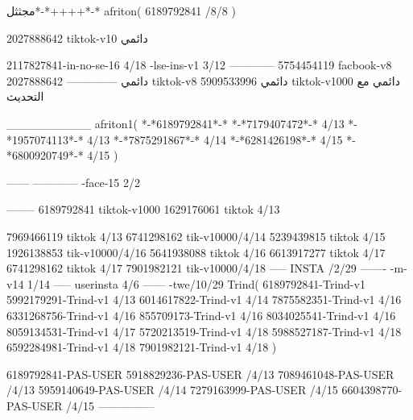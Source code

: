 مجثثل*-*++++*-*
afriton(
6189792841 /8/8
)

2027888642 tiktok-v10
دائمي

2117827841-in-no-se-16 4/18
-lse-ins-v1 3/12
------------
5754454119 facbook-v8
دائمي
--------------
2027888642 tiktok-v8
دائمي
5909533996 tiktok-v1000
دائمي مع التحديث

__________
afriton1(
*-*6189792841*-*
*-*7179407472*-* 4/13
*-*1957074113*-* 4/13
*-*7875291867*-* 4/14
*-*6281426198*-* 4/15
*-*6800920749*-* 4/15
)


------
------------
-face-15 2/2

--------
6189792841 tiktok-v1000
1629176061 tiktok 4/13

7969466119 tiktok 4/13
6741298162 tik-v10000/4/14
5239439815 tiktok 4/15
1926138853 tik-v10000/4/16
5641938088 tiktok 4/16
6613917277 tiktok 4/17
6741298162 tiktok 4/17
7901982121 tik-v10000/4/18
-----
 INSTA /2/29
-------
-m-v14 1/14
-----
userinsta 4/6
------
-twe/10/29
Trind(
6189792841-Trind-v1 
5992179291-Trind-v1  4/13
6014617822-Trind-v1  4/14
7875582351-Trind-v1  4/16
6331268756-Trind-v1  4/16
855709173-Trind-v1  4/16
8034025541-Trind-v1  4/16
8059134531-Trind-v1  4/17
5720213519-Trind-v1  4/18
5988527187-Trind-v1  4/18
6592284981-Trind-v1  4/18
7901982121-Trind-v1  4/18
)

6189792841-PAS-USER
5918829236-PAS-USER /4/13
7089461048-PAS-USER /4/13
5959140649-PAS-USER /4/14
7279163999-PAS-USER /4/15
6604398770-PAS-USER /4/15
    ---------------
